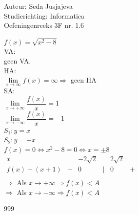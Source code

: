 \documentclass[a4paper]{article}
\newcommand{\limit}{\lim\limits}
\begin{document}
\noindent \large Auteur: Seda Jusjajeva\\
\noindent \large Studierichting: Informatica\\
\noindent \large Oefeningenreeks 3F nr. 1.6 \\

\medskip

\normalsize


$f(x) = \sqrt{x^2 - 8}$ \\

VA: \\

geen VA. \\

HA: \\

$\limit_{x\rightarrow\infty} f(x) = \infty \Rightarrow$ geen HA \\

SA: \\

$\limit_{x \rightarrow +\infty} \dfrac{f(x)}{x} = 1$ \\ 

$\limit_{x \rightarrow -\infty} \dfrac{f(x)}{x} = -1$ \\

$S_1: y = x$ \\

$S_2: y = -x$ \\

$f(x) = 0 \Leftrightarrow x^2 - 8 = 0 \Leftrightarrow x = \pm 8$ \\

$\begin{array}{r|ccccc}
    x              &   & -2\sqrt{2} &   & 2\sqrt{2} &   \\ 
    \hline
    f(x) - (x + 1) & + & 0          & | & 0         & + \\

\end{array}$ \\

$\Rightarrow $ Als $x\rightarrow+\infty\Rightarrow f(x) < A$ \\

$\Rightarrow $ Als $x\rightarrow-\infty\Rightarrow f(x) < A$ \\







\begin{thebibliography}{999}
\end{thebibliography}
\end{document}
